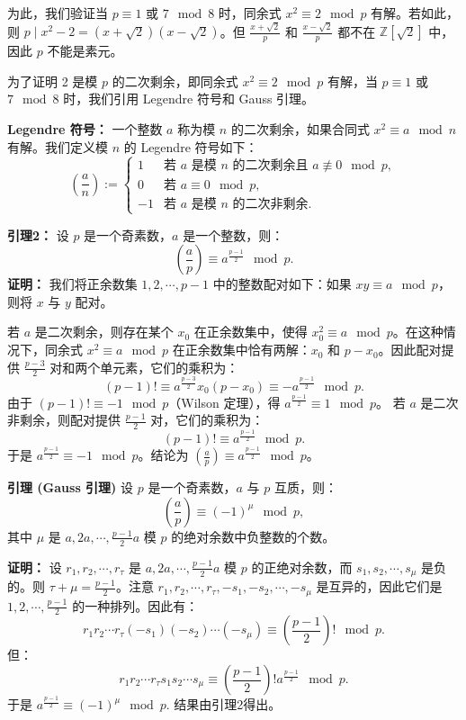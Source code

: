 \documentclass[UTF8]{ctexart}
\begin{document}
\begin{enumerate}
为此，我们验证当 \(p \equiv 1\) 或 \(7 \mod 8\) 时，同余式 \(x^2 \equiv 2 \mod p\) 有解。若如此，则 \(p \mid x^2 - 2 = (x + \sqrt{2})(x - \sqrt{2})\)。但 \(\frac{x + \sqrt{2}}{p}\) 和 \(\frac{x - \sqrt{2}}{p}\) 都不在 \(\mathbb{Z}[\sqrt{2}]\) 中，因此 \(p\) 不能是素元。

为了证明 2 是模 \(p\) 的二次剩余，即同余式 \(x^2 \equiv 2 \mod p\) 有解，当 \(p \equiv 1\) 或 \(7 \mod 8\) 时，我们引用 Legendre 符号和 Gauss 引理。

\textbf{Legendre 符号：} 一个整数 \(a\) 称为模 \(n\) 的二次剩余，如果合同式 \(x^2 \equiv a \mod n\) 有解。我们定义模 \(n\) 的 Legendre 符号如下：
\[
\left(\frac{a}{n}\right) := 
\begin{cases} 
1 & \text{若 } a \text{ 是模 } n \text{ 的二次剩余且 } a \not\equiv 0 \mod p, \\
0 & \text{若 } a \equiv 0 \mod p, \\
-1 & \text{若 } a \text{ 是模 } n \text{ 的二次非剩余}.
\end{cases}
\]

\textbf{引理2：} 设 \(p\) 是一个奇素数，\(a\) 是一个整数，则：
\[
\left(\frac{a}{p}\right) \equiv a^{\frac{p-1}{2}} \mod p.
\]
\textbf{证明：} 我们将正余数集 \(1, 2, \cdots, p-1\) 中的整数配对如下：如果 \(x y \equiv a \mod p\)，则将 \(x\) 与 \(y\) 配对。

若 \(a\) 是二次剩余，则存在某个 \(x_0\) 在正余数集中，使得 \(x_0^2 \equiv a \mod p\)。在这种情况下，同余式 \(x^2 \equiv a \mod p\) 在正余数集中恰有两解：\(x_0\) 和 \(p - x_0\)。因此配对提供 \(\frac{p-3}{2}\) 对和两个单元素，它们的乘积为：
\[
(p-1)! \equiv a^{\frac{p-3}{2}} x_0 (p - x_0) \equiv -a^{\frac{p-1}{2}} \mod p.
\]
由于 \((p-1)! \equiv -1 \mod p\)（Wilson 定理），得 \(a^{\frac{p-1}{2}} \equiv 1 \mod p\)。
若 \(a\) 是二次非剩余，则配对提供 \(\frac{p-1}{2}\) 对，它们的乘积为：
\[
(p-1)! \equiv a^{\frac{p-1}{2}} \mod p.
\]
于是 \(a^{\frac{p-1}{2}} \equiv -1 \mod p\)。结论为 \(\left(\frac{a}{p}\right) \equiv a^{\frac{p-1}{2}} \mod p\)。

\textbf{引理 (Gauss 引理)} 设 \(p\) 是一个奇素数，\(a\) 与 \(p\) 互质，则：
\[
\left(\frac{a}{p}\right) \equiv (-1)^\mu \mod p,
\]
其中 \(\mu\) 是 \(a, 2a, \cdots, \frac{p-1}{2} a\) 模 \(p\) 的绝对余数中负整数的个数。  

\textbf{证明：} 设 \(r_1, r_2, \cdots, r_\tau\) 是 \(a, 2a, \cdots, \frac{p-1}{2} a\) 模 \(p\) 的正绝对余数，而 \(s_1, s_2, \cdots, s_\mu\) 是负的。则 \(\tau + \mu = \frac{p-1}{2}\)。注意 \(r_1, r_2, \cdots, r_\tau, -s_1, -s_2, \cdots, -s_\mu\) 是互异的，因此它们是 \(1, 2, \cdots, \frac{p-1}{2}\) 的一种排列。因此有：
\[
r_1 r_2 \cdots r_\tau (-s_1)(-s_2) \cdots (-s_\mu) \equiv \left(\frac{p-1}{2}\right)! \mod p.
\]
但：
\[
r_1 r_2 \cdots r_\tau s_1 s_2 \cdots s_\mu \equiv \left(\frac{p-1}{2}\right)! a^{\frac{p-1}{2}} \mod p.
\]
于是 \(a^{\frac{p-1}{2}} \equiv (-1)^\mu \mod p\). 结果由引理2得出。


\end{enumerate}
\end{document}
